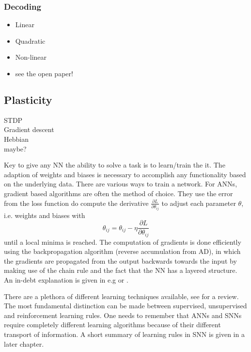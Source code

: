 \subsubsection{Decoding}
	\begin{itemize}
	\item Linear
	\item Quadratic
	\item Non-linear
	\item see the open paper!
	\end{itemize}



 \subsection{Plasticity}
 STDP\\
 Gradient descent\\
 Hebbian\\
 maybe?

 Key to give any \ac{NN} the ability to solve a task is to learn/train the it. The adaption of weights and biases is necessary to accomplish any functionality based on the underlying data\cite{zheng_introductory_2022}. There are various ways to train a network. For \acp{ANN}, gradient based algorithms are often the method of choice. They use the error from the loss function do compute the derivative $\frac{\partial L}{\partial \theta_{ij}}$ to adjust each parameter $\theta$, i.e. weights and biases with
 \begin{equation}
 	\theta_{ij} = \theta_{ij} - \eta \frac{\partial L}{\partial \theta_{ij}}
 \end{equation}
 until a local minima is reached. The computation of gradients is done efficiently using the backpropagation algorithm (reverse accumulation from \ac{AD}), in which the gradients are propagated from the output backwards towards the input by making use of the chain rule and the fact that the \ac{NN} has a layered structure. An in-debt explanation is given in e.g \cite{goodfellow_deep_2016} or \cite{nielsen_neural_2015}.


 There are a plethora of different learning techniques available, see \cite{abdolrasol_artificial_2021}\cite{sun_survey_2019} for a review. The most fundamental distinction can be made between supervised, unsupervised and reinforcement learning rules.
 One needs to remember that \acp{ANN} and \acp{SNN} require completely different learning algorithms because of their different transport of information. A short summary of learning rules in \ac{SNN} is given in a later chapter.\\

